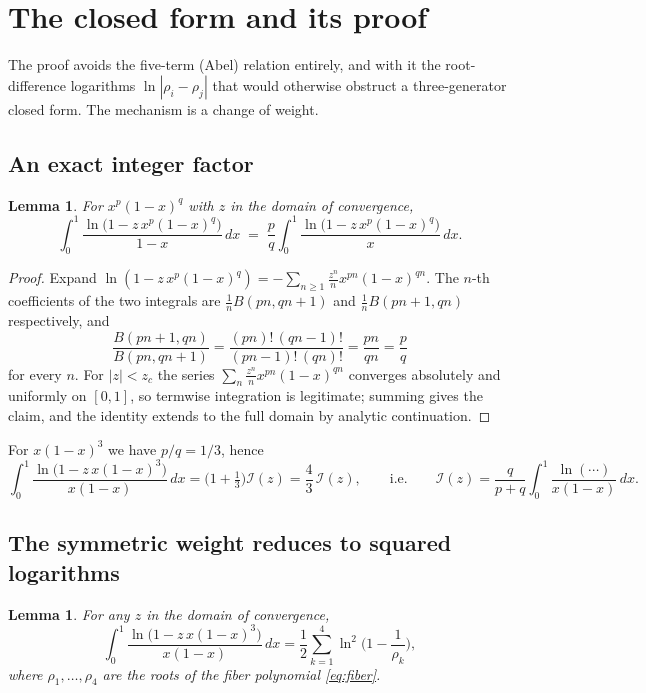 \documentclass[11pt]{article}
\newtheorem{lemma}[theorem]{Lemma}
\theoremstyle{definition}
\begin{document}
\section{The closed form and its proof}\label{sec:proof}

The proof avoids the five-term (Abel) relation entirely, and with it the root-difference
logarithms $\ln|\rho_i-\rho_j|$ that would otherwise obstruct a three-generator closed form. The
mechanism is a change of weight.

\subsection{An exact integer factor}

\begin{lemma}\label{lem:factor}
For $x^p(1-x)^q$ with $z$ in the domain of convergence,
\[
  \int_0^1\frac{\ln\!\big(1-z\,x^p(1-x)^q\big)}{1-x}\,dx
  \;=\;\frac{p}{q}\int_0^1\frac{\ln\!\big(1-z\,x^p(1-x)^q\big)}{x}\,dx .
\]
\end{lemma}

\begin{proof}
Expand $\ln(1-z\,x^p(1-x)^q)=-\sum_{n\ge1}\tfrac{z^n}{n}x^{pn}(1-x)^{qn}$. The $n$-th coefficients of
the two integrals are $\tfrac1n B(pn,qn+1)$ and $\tfrac1n B(pn+1,qn)$ respectively, and
\[
  \frac{B(pn+1,qn)}{B(pn,qn+1)}
  =\frac{(pn)!\,(qn-1)!}{(pn-1)!\,(qn)!}
  =\frac{pn}{qn}=\frac{p}{q}
\]
for every $n$. For $|z|<z_c$ the series $\sum_n \tfrac{z^n}{n}x^{pn}(1-x)^{qn}$ converges absolutely
and uniformly on $[0,1]$, so termwise integration is legitimate; summing gives the claim, and the
identity extends to the full domain by analytic continuation. \qedhere
\end{proof}

For $x(1-x)^3$ we have $p/q=1/3$, hence
\begin{equation}\label{eq:sym-weight}
  \int_0^1\frac{\ln\!\big(1-z\,x(1-x)^3\big)}{x(1-x)}\,dx
  =\Big(1+\tfrac13\Big)\mathcal{I}(z)=\frac{4}{3}\,\mathcal{I}(z),
  \qquad\text{i.e.}\qquad
  \mathcal{I}(z)=\frac{q}{p+q}\!\int_0^1\!\frac{\ln(\cdots)}{x(1-x)}\,dx .
\end{equation}

\subsection{The symmetric weight reduces to squared logarithms}

\begin{lemma}\label{lem:landen}
For any $z$ in the domain of convergence,
\[
  \int_0^1\frac{\ln\!\big(1-z\,x(1-x)^3\big)}{x(1-x)}\,dx
  =\frac12\sum_{k=1}^4\ln^2\!\Big(1-\frac1{\rho_k}\Big),
\]
where $\rho_1,\dots,\rho_4$ are the roots of the fiber polynomial \eqref{eq:fiber}.
\end{lemma}
\end{document}
